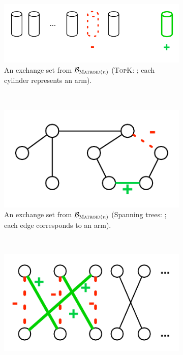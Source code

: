 \documentclass{article}
\newcommand{\B}{\mathcal B}
\newcommand{\MultiIdent}{\textsc{TopK}\xspace}
\newcommand{\Matroid}{\textsc{Matroid}\xspace}
\begin{document}
\begin{figure}[ht]
\centering
\begin{subfigure}[c]{0.45\textwidth}
	\includegraphics[width=\textwidth]{fig/exchange-multi}
	\caption{An exchange set from $\B_{\Matroid(n)}$ (\MultiIdent: ; each cylinder represents an arm).}
	\label{fig:exchange:topk}	
\end{subfigure}
~
\begin{subfigure}[c]{0.45\textwidth}
	\includegraphics[width=\textwidth]{fig/exchange-matroid}
	\caption{An exchange set from $\B_{\Matroid(n)}$ (Spanning trees: ; each edge corresponds to an arm).}
	\label{fig:exchange:matroid}
\end{subfigure}
~
\begin{subfigure}[c]{0.45\textwidth}
	\includegraphics[width=\textwidth]{fig/exchange-match}

\end{subfigure}
\end{figure}
\end{document}
